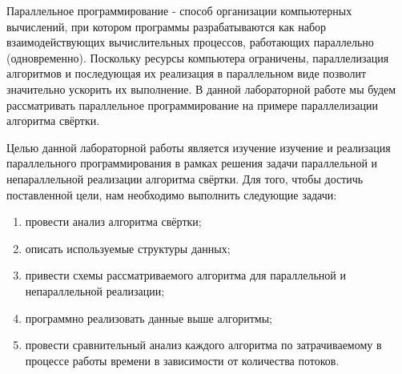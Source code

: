 \Introduction
Параллельное программирование - способ организации компьютерных вычислений, при котором программы разрабатываются как набор взаимодействующих вычислительных процессов, работающих параллельно (одновременно). Поскольку ресурсы компьютера ограничены, параллелизация алгоритмов и последующая их реализация в параллельном виде позволит значительно ускорить их выполнение. В данной лабораторной работе мы будем рассматривать параллельное программирование на примере параллелизации алгоритма свёртки.

Целью данной лабораторной работы является изучение изучение и реализация параллельного программирования в рамках решения задачи параллельной и непараллельной реализации алгоритма свёртки. Для того, чтобы достичь поставленной цели, нам необходимо выполнить следующие задачи:

\begin{enumerate}
	\item провести анализ алгоритма свёртки;
	\item описать используемые структуры данных;
	\item привести схемы рассматриваемого алгоритма для параллельной и непараллельной реализации;
	\item программно реализовать данные выше алгоритмы;
	\item провести сравнительный анализ каждого алгоритма по затрачиваемому в процессе работы времени в зависимости от количества потоков.
\end{enumerate}
